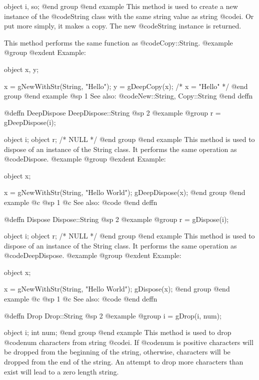 object  i, so;
@end group
@end example
This method is used to create a new instance of the @code{String} class
with the same string value as string @code{i}.  Or put more simply,
it makes a copy.  The new @code{String} instance is returned.

This method performs the same function as @code{Copy::String}.
@example
@group
@exdent Example:

object  x, y;

x = gNewWithStr(String, "Hello");
y = gDeepCopy(x);
/*  x = "Hello"  */
@end group
@end example
@sp 1
See also:  @code{New::String, Copy::String}
@end deffn







@deffn {DeepDispose} DeepDispose::String
@sp 2
@example
@group
r = gDeepDispose(i);

object  i;
object  r;     /*  NULL  */
@end group
@end example
This method is used to dispose of an instance of the String class.
It performs the same operation as @code{Dispose}.
@example
@group
@exdent Example:

object  x;

x = gNewWithStr(String, "Hello World");
gDeepDispose(x);
@end group
@end example
@c @sp 1
@c See also:  @code{}
@end deffn








@deffn {Dispose} Dispose::String
@sp 2
@example
@group
r = gDispose(i);

object  i;
object  r;     /*  NULL  */
@end group
@end example
This method is used to dispose of an instance of the String class.
It performs the same operation as @code{DeepDispose}.
@example
@group
@exdent Example:

object  x;

x = gNewWithStr(String, "Hello World");
gDispose(x);
@end group
@end example
@c @sp 1
@c See also:  @code{}
@end deffn


















@deffn {Drop} Drop::String
@sp 2
@example
@group
i = gDrop(i, num);

object  i;
int     num;
@end group
@end example
This method is used to drop @code{num} characters from string @code{i}.
If @code{num} is positive characters will be dropped from the beginning
of the string, otherwise, characters will be dropped from the end of the
string.  An attempt to drop more characters than exist will lead to a
zero length string.

